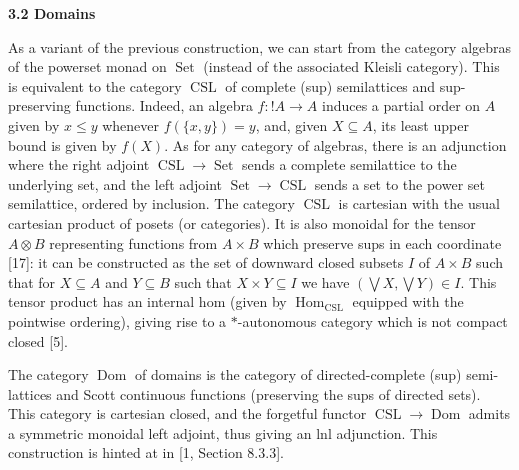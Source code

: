  
 
 
\par\medskip\noindent\textbf{3.2 Domains}\par
 
 
As a variant of the previous construction, we can start from the category algebras of the powerset monad on $\operatorname{Set}$ (instead of the associated Kleisli category). This is equivalent to the category $\operatorname{CSL}$ of complete (sup) semilattices and sup-preserving functions. Indeed, an algebra $f:\mathop{!}A\to A$ induces a partial order on $A$ given by $x\leq y$ whenever $f(\{x,y\})=y$, and, given $X\subseteq A$, its least upper bound is given by $f(X)$. As for any category of algebras, there is an adjunction where the right adjoint $\operatorname{CSL}\to\operatorname{Set}$ sends a complete semilattice to the underlying set, and the left adjoint $\operatorname{Set}\to\operatorname{CSL}$ sends a set to the power set semilattice, ordered by inclusion. The category $\operatorname{CSL}$ is cartesian with the usual cartesian product of posets (or categories). It is also monoidal for the tensor $A\otimes B$ representing functions from $A\times B$ which preserve sups in each coordinate [17]: it can be constructed as the set of downward closed subsets $I$ of $A\times B$ such that for $X\subseteq A$ and $Y\subseteq B$ such that $X\times Y\subseteq I$ we have $(\bigvee X,\bigvee Y)\in I$. This tensor product has an internal hom (given by $\operatorname{Hom}_{\operatorname{CSL}}$ equipped with the pointwise ordering), giving rise to a $*$-autonomous category which is not compact closed [5].\par
 
 
 
The category $\operatorname{Dom}$ of domains is the category of directed-complete (sup) semi-lattices and Scott continuous functions (preserving the sups of directed sets). This category is cartesian closed, and the forgetful functor $\operatorname{CSL}\to\operatorname{Dom}$ admits a symmetric monoidal left adjoint, thus giving an lnl adjunction. This construction is hinted at in [1, Section 8.3.3].\par
 
 
 
